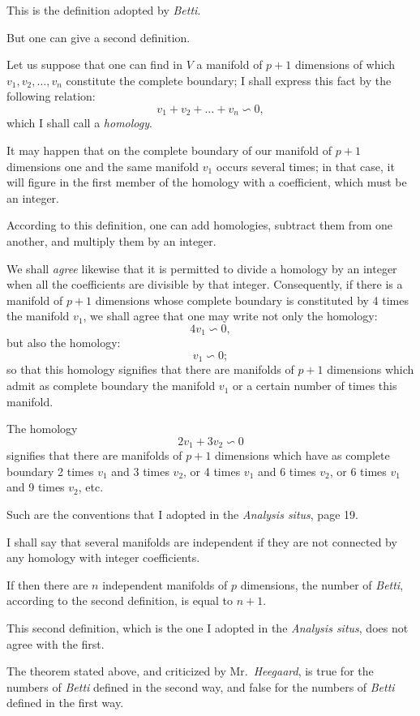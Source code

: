 \documentclass{article}
\begin{document}
This is the definition adopted by \emph{Betti}.

But one can give a second definition.

Let us suppose that one can find in $V$ a manifold of $p+1$ dimensions of which $v_{1}, v_{2}, \ldots, v_{n}$ constitute the complete boundary; I shall express this fact by the following relation:
\[ v_{1} + v_{2} + \ldots + v_{n} \backsim 0, \]
which I shall call a \emph{homology}.

It may happen that on the complete boundary of our manifold of $p+1$ dimensions one and the same manifold $v_{1}$ occurs several times; in that case, it will figure in the first member of the homology with a coefficient, which must be an integer.

According to this definition, one can add homologies, subtract them from one another, and multiply them by an integer.

We shall \emph{agree} likewise that it is permitted to divide a homology by an integer when all the coefficients are divisible by that integer. Consequently, if there is a manifold of $p+1$ dimensions whose complete boundary is constituted by 4 times the manifold $v_{1}$, we shall agree that one may write not only the homology:
\[ 4v_{1} \backsim 0, \]
but also the homology:
\[ v_{1} \backsim 0; \]
so that this homology signifies that there are manifolds of $p+1$ dimensions which admit as complete boundary the manifold $v_{1}$ or a certain number of times this manifold.

The homology
\[ 2v_{1} + 3v_{2} \backsim 0 \]
signifies that there are manifolds of $p+1$ dimensions which have as complete boundary 2 times $v_{1}$ and 3 times $v_{2}$, or 4 times $v_{1}$ and 6 times $v_{2}$, or 6 times $v_{1}$ and 9 times $v_{2}$, etc.

Such are the conventions that I adopted in the \emph{Analysis situs}, page 19.

I shall say that several manifolds are independent if they are not connected by any homology with integer coefficients.

If then there are $n$ independent manifolds of $p$ dimensions, the number of \emph{Betti}, according to the second definition, is equal to $n+1$.

This second definition, which is the one I adopted in the \emph{Analysis situs}, does not agree with the first.

The theorem stated above, and criticized by Mr.~\emph{Heegaard}, is true for the numbers of \emph{Betti} defined in the second way, and false for the numbers of \emph{Betti} defined in the first way.
\end{document}
